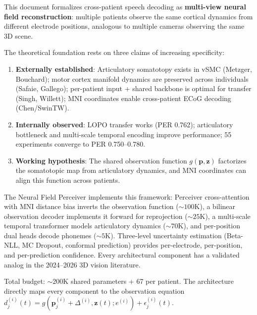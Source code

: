 \documentclass[11pt,letterpaper]{article}
\newcommand{\bfp}{\mathbf{p}}
\newcommand{\bfz}{\mathbf{z}}
\begin{document}
This document formalizes cross-patient speech decoding as \textbf{multi-view neural field reconstruction}: multiple patients observe the same cortical dynamics from different electrode positions, analogous to multiple cameras observing the same 3D scene.

The theoretical foundation rests on three claims of increasing specificity:
\begin{enumerate}[leftmargin=2em]
\item \textbf{Externally established}: Articulatory somatotopy exists in vSMC (Metzger, Bouchard); motor cortex manifold dynamics are preserved across individuals (Safaie, Gallego); per-patient input + shared backbone is optimal for transfer (Singh, Willett); MNI coordinates enable cross-patient ECoG decoding (Chen/SwinTW).
\item \textbf{Internally observed}: LOPO transfer works (PER 0.762); articulatory bottleneck and multi-scale temporal encoding improve performance; 55 experiments converge to PER 0.750--0.780.
\item \textbf{Working hypothesis}: The shared observation function $g(\bfp, \bfz)$ factorizes the somatotopic map from articulatory dynamics, and MNI coordinates can align this function across patients.
\end{enumerate}

The Neural Field Perceiver implements this framework: Perceiver cross-attention with MNI distance bias inverts the observation function (${\sim}100$K), a bilinear observation decoder implements it forward for reprojection (${\sim}25$K), a multi-scale temporal transformer models articulatory dynamics (${\sim}70$K), and per-position dual heads decode phonemes (${\sim}5$K). Three-level uncertainty estimation (Beta-NLL, MC Dropout, conformal prediction) provides per-electrode, per-position, and per-prediction confidence. Every architectural component has a validated analog in the 2024--2026 3D vision literature.

Total budget: ${\sim}200$K shared parameters + 67 per patient. The architecture directly maps every component to the observation equation $d_j^{(i)}(t) = g(\bfp_j^{(i)} + \Delta^{(i)}, \bfz(t); e^{(i)}) + \epsilon_j^{(i)}(t)$.
\end{document}
